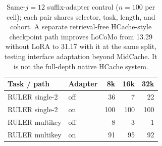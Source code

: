 \begin{table}[htbp]
\centering
\small
\setlength{\tabcolsep}{4pt}
\begin{tabular}{@{}llrrr@{}}
\toprule
Task / path & Adapter & 8k & 16k & 32k \\
\midrule
RULER single-2 & off & 36 & 7 & 22 \\
RULER single-2 & on & 100 & 100 & 100 \\
RULER multikey & off & 8 & 3 & 1 \\
RULER multikey & on & 91 & 95 & 92 \\
\bottomrule
\end{tabular}
\caption{Same-$j=12$ suffix-adapter control ($n=100$ per cell); each pair shares selector, task, length, and cohort. A separate retrieval-free HCache-style checkpoint path improves LoCoMo from 13.29 without LoRA to 31.17 with it at the same split, testing interface adaptation beyond MidCache. It is not the full-depth native HCache system.}
\label{tab:adapter-detail}
\end{table}
